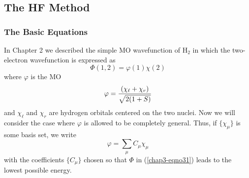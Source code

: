\subsection{The HF Method}

\subsubsection{The Basic Equations}

In Chapter 2 we described the simple MO wavefunction of H$_2$ in
which the two-electron wavefunction is expressed as
\begin{equation}
\Phi ( 1 , 2 ) = \varphi ( 1 ) \chi ( 2 )
\label{chap3-eqno31}
\end{equation}
where $\varphi$ is the MO
\begin{equation}
\varphi = {( \chi_\ell + \chi_r ) \over \sqrt{2(1+S)}}
\end{equation}
and $\chi_\ell$ and $\chi_r$ are hydrogen orbitals centered on the two 
nuclei.  Now we will consider the case where $\varphi$ is allowed to be 
completely general.  Thus, if $\{ \chi_{\mu} \}$ is some basis set,
we write
\begin{equation}
\varphi = \sum_{\mu} C_{\mu} \chi_{\mu}
\label{chap3-eqno32}
\end{equation}
with the coefficients $\{ C_{\mu} \}$ chosen so that $\Phi$ in
(\ref{chap3-eqno31}) leads to the lowest possible energy.

